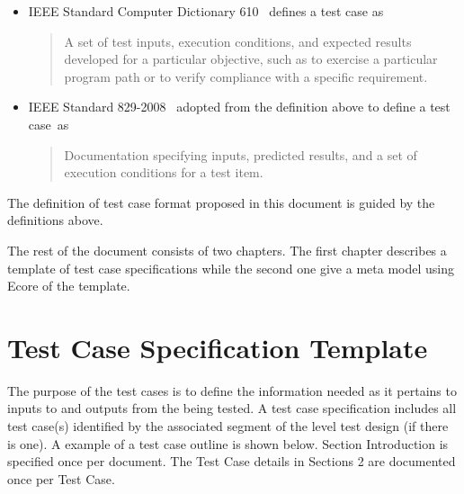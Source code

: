 \documentclass{./template/openetcs_report}
\begin{document}
\begin{itemize}
	\item IEEE Standard Computer Dictionary 610~\cite{Ieee1990} defines a test
	case as
	\begin{quote}
	A set of test inputs, execution conditions, and expected results developed for
	a particular objective, such as to exercise a particular program path or to
	verify compliance with a specific requirement.
	\end{quote}
	
	\item IEEE Standard 829-2008~\cite{Ieee2008} adopted from the definition
	above to define a test case~as
	\begin{quote}
	Documentation specifying inputs, predicted results, and a set of execution
	conditions for a test item.
	\end{quote}

\end{itemize}


The definition of test case format proposed in this document is guided by the
definitions above.
 

The rest of the document consists of two chapters. The first chapter describes
a template of test case specifications while the second one give a meta model
using Ecore of the template.

\chapter{Test Case Specification Template}

The purpose of the test cases is to define 
the information needed as it pertains to inputs to and outputs from the 
 being tested. 
A test case specification includes all test case(s) identified by the
associated segment of the level test design (if there is one).
A example of a test case outline is shown below.
Section Introduction is specified once per document. 
The Test Case details in Sections 2 are documented once per Test Case.
\end{document}
